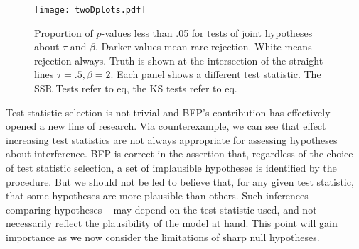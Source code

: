 \begin{figure}[h!]
\centering
\texttt{[image: twoDplots.pdf]}
\caption{Proportion of $p$-values less than .05 for tests of joint hypotheses
about $\tau$ and $\beta$. Darker values mean rare rejection. White means
rejection always. Truth is shown at the intersection of the straight
lines  $\tau=.5, \beta=2$. Each panel shows a different test statistic. The
SSR Tests refer to eq, the KS tests refer to eq.  }\label{fig:ks}
\end{figure}


Test statistic selection is not trivial and BFP's contribution has effectively
opened a new line of research. Via counterexample, we can see that effect
increasing test statistics are not always appropriate for assessing hypotheses
about interference. BFP is correct in the assertion that, regardless of the
choice of test statistic selection, a set of implausible hypotheses is
identified by the procedure. But we should not be led to believe that, for any
given test statistic, that some hypotheses are more plausible than others.
Such inferences -- comparing hypotheses -- may depend on the test statistic
used, and not necessarily reflect the plausibility of the model at hand. This
point will gain importance as we now consider the limitations of sharp null
hypotheses.



